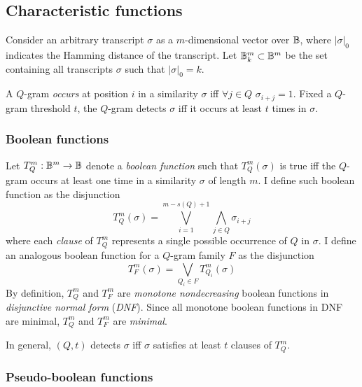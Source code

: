 \subsection{Characteristic functions}

Consider an arbitrary transcript $\sigma$ as a $m$-dimensional vector over $\mathbb {B}$, where $|\sigma|_0$ indicates the Hamming distance of the transcript.
Let $\mathbb {B}^m_k \subset \mathbb {B}^m$ be the set containing all transcripts $\sigma$ such that $|\sigma|_0 = k$.

\begin{definition}
A $Q$-gram \emph{occurs} at position $i$ in a similarity $\sigma$ iff $\forall j \in Q$ $\sigma_{i+j}=1$.
Fixed a $Q$-gram threshold $t$, the $Q$-gram detects $\sigma$ iff it occurs at least $t$ times in $\sigma$.
\end{definition}

\subsubsection{Boolean functions}

Let $T_{Q}^{m}: \mathbb {B}^m \rightarrow \mathbb {B}$ denote a \emph{boolean function} such that $T_{Q}^{m}(\sigma)$ is true iff the $Q$-gram occurs at least one time in a similarity $\sigma$ of length $m$.
I define such boolean function as the disjunction
\begin{equation}
\label{eq:qgram-bool}
T_{Q}^{m}(\sigma) = \bigvee_{i=1}^{m-s(Q)+1} \bigwedge_{j \in Q} \sigma_{i+j}
\end{equation}
where each \emph{clause} of $T_{Q}^{m}$ represents a single possible occurrence of $Q$ in $\sigma$.
I define an analogous boolean function for a $Q$-gram family $F$ as the disjunction
\begin{equation}
\label{eq:family-bool}
T_{F}^{m}(\sigma) = \bigvee_{Q_i \in F} T_{Q_i}^{m}(\sigma)
\end{equation}
By definition, $T_{Q}^{m}$ and $T_{F}^{m}$ are \emph{monotone nondecreasing} boolean functions in \emph{disjunctive normal form} (\emph{DNF}).
Since all monotone boolean functions in DNF are minimal, $T_{Q}^{m}$ and $T_{F}^{m}$ are \emph{minimal}.

In general, $(Q,t)$ detects $\sigma$ iff $\sigma$ satisfies at least $t$ clauses of $T_{Q}^{m}$.

\subsubsection{Pseudo-boolean functions}


